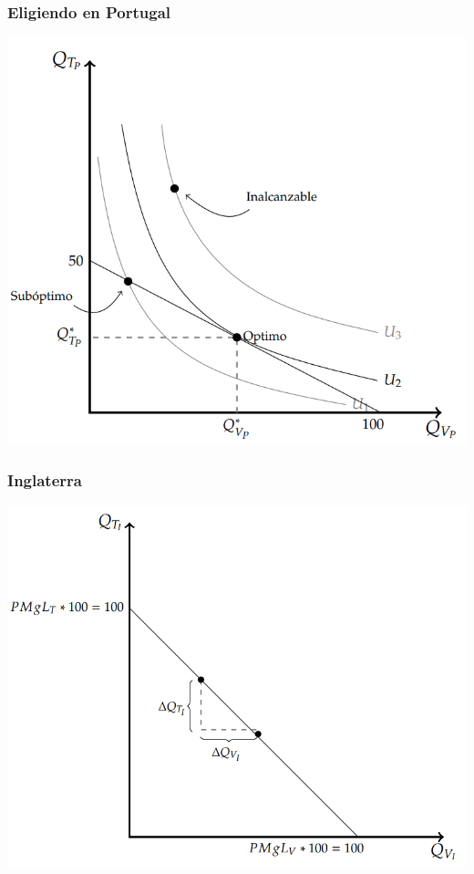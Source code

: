 \documentclass{beamer}
\begin{document}
\begin{frame}
\frametitle{Eligiendo en Portugal}
\centering
\includegraphics[scale=0.6]{../Figures/C18.3.png}
\end{frame}

\begin{frame}
\frametitle{Inglaterra}
\centering
\includegraphics[scale=0.6]{../Figures/C18.4.png}
\end{frame}
\end{document}
